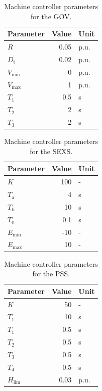 \begin{table}[H]
    \caption{Machine controller parameters for the \acf{GOV}.}
    \vspace*{12pt}
    \centering
    \small
    \begin{tabularx}{\textwidth}{Xrl}
        \textbf{Parameter} & \textbf{Value} & \textbf{Unit} \\ \hline
        \toprule
        $R$ & 0.05 & p.u. \\
        $D_\mathrm{t}$ & 0.02 & p.u. \\
        $V_\mathrm{min}$ & 0 & p.u. \\
        $V_\mathrm{max}$ & 1 & p.u. \\
        $T_1$ & 0.5 & s \\
        $T_2$ & 2 & s \\
        $T_3$ & 2 & s \\
        \bottomrule
    \end{tabularx}
\end{table}

\begin{table}[H]
    \caption{Machine controller parameters for the \acf{SEXS}.}
    \vspace*{12pt}
    \centering
    \small
    \begin{tabularx}{\textwidth}{Xrl}
        \textbf{Parameter} & \textbf{Value} & \textbf{Unit} \\ \hline
        \toprule
        $K$ & 100 & - \\
        $T_\mathrm{a}$ & 4 & s \\
        $T_\mathrm{b}$ & 10 & s \\
        $T_\mathrm{e}$ & 0.1 & s \\
        $E_\mathrm{min}$ & -10 & - \\
        $E_\mathrm{max}$ & 10 & - \\
        \bottomrule
    \end{tabularx}
\end{table}

\begin{table}[H]
    \caption{Machine controller parameters for the \acf{PSS}.}
    \vspace*{12pt}
    \centering
    \small
    \begin{tabularx}{\textwidth}{Xrl}
        \textbf{Parameter} & \textbf{Value} & \textbf{Unit} \\ \hline
        \toprule
        $K$ & 50 & - \\
        $T_1$ & 10 & s \\
        $T_1$ & 0.5 & s \\
        $T_2$ & 0.5 & s \\
        $T_3$ & 0.5 & s \\
        $T_4$ & 0.5 & s \\
        $H_\mathrm{lim}$ & 0.03 & p.u. \\
        \bottomrule
    \end{tabularx}
\end{table}

